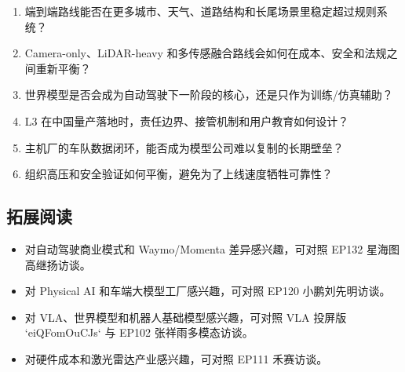 \begin{enumerate}
\item 端到端路线能否在更多城市、天气、道路结构和长尾场景里稳定超过规则系统？
\item Camera-only、LiDAR-heavy 和多传感融合路线会如何在成本、安全和法规之间重新平衡？
\item 世界模型是否会成为自动驾驶下一阶段的核心，还是只作为训练/仿真辅助？
\item L3 在中国量产落地时，责任边界、接管机制和用户教育如何设计？
\item 主机厂的车队数据闭环，能否成为模型公司难以复制的长期壁垒？
\item 组织高压和安全验证如何平衡，避免为了上线速度牺牲可靠性？
\end{enumerate}

\subsection{拓展阅读}

\begin{itemize}
\item 对自动驾驶商业模式和 Waymo/Momenta 差异感兴趣，可对照 EP132 星海图高继扬访谈。
\item 对 Physical AI 和车端大模型工厂感兴趣，可对照 EP120 小鹏刘先明访谈。
\item 对 VLA、世界模型和机器人基础模型感兴趣，可对照 VLA 投屏版 `eiQFomOuCJs` 与 EP102 张祥雨多模态访谈。
\item 对硬件成本和激光雷达产业感兴趣，可对照 EP111 禾赛访谈。
\end{itemize}



